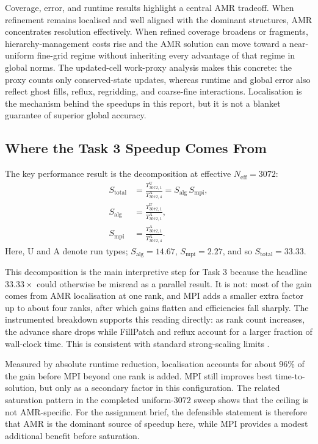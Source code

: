 \documentclass[final,3p,times,twocolumn]{elsarticle}
\begin{document}
Coverage, error, and runtime results highlight a central AMR tradeoff. When refinement remains localised and well aligned with the dominant structures, AMR concentrates resolution effectively. When refined coverage broadens or fragments, hierarchy-management costs rise and the AMR solution can move toward a near-uniform fine-grid regime without inheriting every advantage of that regime in global norms. The updated-cell work-proxy analysis makes this concrete: the proxy counts only conserved-state updates, whereas runtime and global error also reflect ghost fills, reflux, regridding, and coarse-fine interactions. Localisation is the mechanism behind the speedups in this report, but it is not a blanket guarantee of superior global accuracy.

\subsection{Where the Task 3 Speedup Comes From}

The key performance result is the decomposition at effective $N_\mathrm{eff}=3072$:
\begin{equation}
\label{eq:task3_speedup_decomposition}
\begin{aligned}
S_{\mathrm{total}}
&= \frac{T^{\mathrm{U}}_{3072,1}}{T^{\mathrm{A}}_{3072,4}}
= S_{\mathrm{alg}}\,S_{\mathrm{mpi}}, \\
S_{\mathrm{alg}}
&= \frac{T^{\mathrm{U}}_{3072,1}}{T^{\mathrm{A}}_{3072,1}}, \\
S_{\mathrm{mpi}}
&= \frac{T^{\mathrm{A}}_{3072,1}}{T^{\mathrm{A}}_{3072,4}}.
\end{aligned}
\end{equation}
Here, $\mathrm{U}$ and $\mathrm{A}$ denote run types; $S_{\mathrm{alg}}=14.67$, $S_{\mathrm{mpi}}=2.27$, and so $S_{\mathrm{total}}=33.33$.

This decomposition is the main interpretive step for Task 3 because the headline $33.33\times$ could otherwise be misread as a parallel result. It is not: most of the gain comes from AMR localisation at one rank, and MPI adds a smaller extra factor up to about four ranks, after which gains flatten and efficiencies fall sharply. The instrumented breakdown supports this reading directly: as rank count increases, the advance share drops while FillPatch and reflux account for a larger fraction of wall-clock time. This is consistent with standard strong-scaling limits \cite{amdahl1967}.

Measured by absolute runtime reduction, localisation accounts for about 96\% of the gain before MPI beyond one rank is added. MPI still improves best time-to-solution, but only as a secondary factor in this configuration. The related saturation pattern in the completed uniform-$3072$ sweep shows that the ceiling is not AMR-specific. For the assignment brief, the defensible statement is therefore that AMR is the dominant source of speedup here, while MPI provides a modest additional benefit before saturation.
\end{document}
